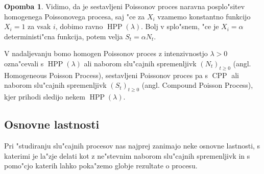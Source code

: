 \documentclass[12pt, a4paper, reqno]{amsart}
\theoremstyle{definition}
\newtheorem{opomba}[definicija]{Opomba}
\theoremstyle{plain}
\newcommand{\1}{\mathds{1}}
\DeclareMathOperator{\HPP}{HPP}
\DeclareMathOperator{\CPP}{CPP}
\begin{document}
    \begin{opomba}
        Vidimo, da je sestavljeni Poissonov proces naravna posplo"sitev homogenega Poissonovega procesa, saj "ce za
        $X_i$ vzamemo konstantno funkcijo $X_i = 1$ za vsak $i$, dobimo ravno $\HPP(\lambda)$. Bolj v splo"snem, "ce je 
        $X_i = \alpha$ deterministi"cna funkcija, potem velja $S_t = \alpha N_t$.
        \label{op:CPPHPPPovezava}
    \end{opomba}

    V nadaljevanju bomo homogen Poissonov proces z intenzivnostjo $\lambda >0$ ozna"cevali s $\HPP(\lambda)$ 
    ali naborom slu"cajnih spremenljivk $(N_t)_{t\geq0}$ (angl. Homogeneous Poisson Process), 
    sestavljeni Poissonov proces pa s $\CPP$ ali naborom slu"cajnih spremenljivk $(S_t)_{t\geq0}$ 
    (angl. Compound Poisson Process), kjer  prihodi sledijo nekem $\HPP(\lambda)$. 

    \subsection{Osnovne lastnosti}
    
        Pri "studiranju slu"cajnih procesov nas najprej zanimajo neke osnovne lastnosti, s katerimi 
        je la"zje delati kot z ne"stevnim naborom slu"cajnih spremenljivk in s pomo"cjo katerih 
        lahko poka"zemo globje rezultate o procesu. 
\end{document}
